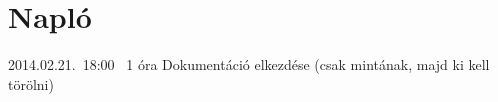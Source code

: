 %
\section{Napló}

\begin{naplo}

\bejegyzes
{2014.02.21.~18:00~} %
{1 óra} %
{\antal} %
{Dokumentáció elkezdése (csak mintának, majd ki kell törölni)} %

\end{naplo}

